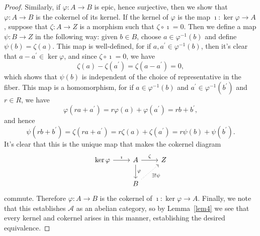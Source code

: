 \documentclass[10pt]{amsart}
\begin{document}
\begin{ex}
\begin{proof}
    Similarly, if $\varphi : A \rightarrow B$ is epic, hence surjective, then we show that $\varphi: A \rightarrow B$ is the cokernel of its kernel.
    If the kernel of $\varphi$ is the map $\imath : \ker\varphi \rightarrow A$, suppose that $\zeta : A \rightarrow Z$ is a morphism such that $\zeta \circ \imath = 0$.
    Then we define a map $\psi : B \rightarrow Z$ in the following way: given $b \in B$, choose $a \in \varphi^{-1}(b)$ and define $\psi(b) = \zeta(a)$.
    This map is well-defined, for if $a, a^\prime \in \varphi^{-1}(b)$, then it's clear that $a - a^\prime \in \ker\varphi$, and since $\zeta \circ \imath = 0$, we have    
    $$\zeta(a) - \zeta(a^\prime) = \zeta(a - a^\prime) = 0,$$
    which shows that $\psi(b)$ is independent of the choice of representative in the fiber.
    This map is a homomorphism, for if $a \in \varphi^{-1}(b)$ and $a^\prime \in \varphi^{-1}(b^\prime)$ and $r \in R$, we have
    $$\varphi(ra + a^\prime) = r\varphi(a) + \varphi(a^\prime) = rb + b^\prime,$$
    and hence
    $$\psi(rb + b^\prime) = \zeta(ra + a^\prime) = r\zeta(a) + \zeta(a^\prime) = r\psi(b) + \psi(b^\prime).$$
    It's clear that this is the unique map that makes the cokernel diagram
    $$\begin{tikzcd}
      \ker\varphi \arrow{r}{\imath} & A \arrow{d}{\varphi} \arrow{r}{\zeta} &Z\\
      & B\arrow[dotted,swap]{ur}{\exists ! \psi}
    \end{tikzcd}$$
    commute.
    Therefore $\varphi : A \rightarrow B$ is the cokernel of $\imath : \ker\varphi \rightarrow A$.
    Finally, we note that this establishes $\mathcal{A}$ as an abelian category, so by Lemma~\ref{lem4} we see that every kernel and cokernel arises in this manner, establishing the desired equivalence.
  \end{proof}
\end{ex}
\end{document}
